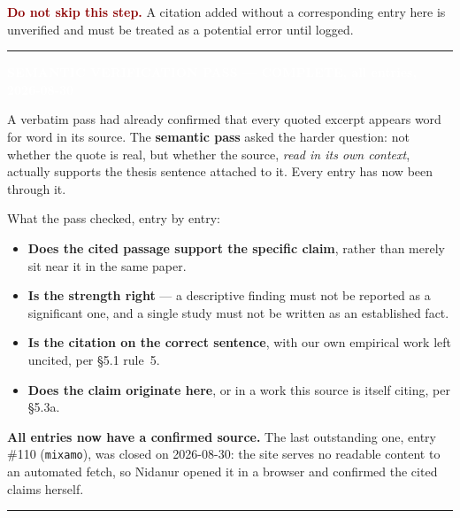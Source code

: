 \documentclass[11pt, a4paper]{article}
\begin{document}
\begin{Form}
\noindent\textcolor{darkred}{\textbf{Do not skip this step.}} A citation added without a corresponding entry here is unverified and must be treated as a potential error until logged.

\vspace{6pt}
\noindent\textcolor{midgray}{\rule{\linewidth}{0.8pt}}
\vspace{4pt}

\vspace{6pt}
\noindent\colorbox{konstanzblue}{\parbox{\dimexpr\linewidth-2\fboxsep}{%
  \vspace{4pt}
  \textcolor{white}{\textbf{SEMANTIC VERIFICATION PASS --- COMPLETE, all entries, 2026-08-30}}
  \vspace{4pt}
}}
\vspace{4pt}

\noindent A verbatim pass had already confirmed that every quoted excerpt appears word for word in its source. The \textbf{semantic pass} asked the harder question: not whether the quote is real, but whether the source, \emph{read in its own context}, actually supports the thesis sentence attached to it. Every entry has now been through it.

\noindent What the pass checked, entry by entry:
\begin{itemize}
  \item \textbf{Does the cited passage support the specific claim}, rather than merely sit near it in the same paper.
  \item \textbf{Is the strength right} --- a descriptive finding must not be reported as a significant one, and a single study must not be written as an established fact.
  \item \textbf{Is the citation on the correct sentence}, with our own empirical work left uncited, per \S5.1 rule~5.
  \item \textbf{Does the claim originate here}, or in a work this source is itself citing, per \S5.3a.
\end{itemize}

\noindent\textbf{All entries now have a confirmed source.} The last outstanding one, entry \#110 (\texttt{mixamo}), was closed on 2026-08-30: the site serves no readable content to an automated fetch, so Nidanur opened it in a browser and confirmed the cited claims herself.

\vspace{6pt}
\noindent\textcolor{midgray}{\rule{\linewidth}{0.8pt}}
\vspace{4pt}


\end{Form}
\end{document}
